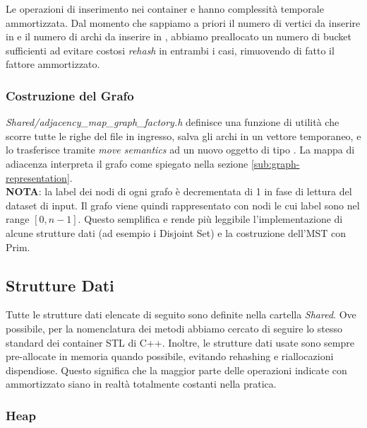 \noindent Le operazioni di inserimento nei container  e  hanno complessità temporale \complexityConstant{} ammortizzata. Dal momento che sappiamo a priori il numero di vertici da inserire in  e il numero di archi da inserire in , abbiamo preallocato un numero di bucket sufficienti ad evitare costosi \textit{rehash} in entrambi i casi, rimuovendo di fatto il fattore ammortizzato.

\subsubsection {Costruzione del Grafo}

\textit{Shared/adjacency\_map\_graph\_factory.h} definisce una funzione di utilità che scorre tutte le righe del file in ingresso, salva gli archi in un vettore temporaneo, e lo trasferisce tramite \textit{move semantics} ad un nuovo oggetto di tipo . La mappa di adiacenza interpreta il grafo come spiegato nella sezione \ref{sub:graph-representation}. \\

\noindent \textbf{NOTA}: la label dei nodi di ogni grafo è decrementata di 1 in fase di lettura del dataset di input. Il grafo viene quindi rappresentato con nodi le cui label sono nel range $[0, n-1]$.
Questo semplifica e rende più leggibile l'implementazione di alcune strutture dati (ad esempio i Disjoint Set) e la costruzione dell'MST con Prim.

\subsection{Strutture Dati}

Tutte le strutture dati elencate di seguito sono definite nella cartella \textit{Shared}.
Ove possibile, per la nomenclatura dei metodi abbiamo cercato di seguire lo stesso standard dei container STL di C++.
Inoltre, le strutture dati usate sono sempre pre-allocate in memoria quando possibile, evitando rehashing e riallocazioni dispendiose. Questo significa che la maggior parte delle operazioni indicate con \complexityConstant{} ammortizzato siano in realtà totalmente costanti nella pratica.

\subsubsection{Heap}

